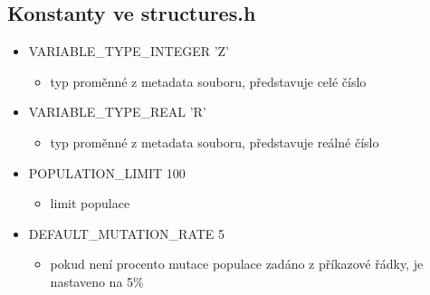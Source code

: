 \documentclass{article}
\begin{document}
\subsection{Konstanty ve structures.h}
\begin{itemize}
\item VARIABLE\_TYPE\_INTEGER 'Z'
\begin{itemize}
\item typ proměnné z metadata souboru, představuje celé číslo
\end{itemize}
\item VARIABLE\_TYPE\_REAL 'R'
\begin{itemize}
\item typ proměnné z metadata souboru, představuje reálné číslo
\end{itemize}
\item POPULATION\_LIMIT 100
\begin{itemize}
\item limit populace
\end{itemize}
\item DEFAULT\_MUTATION\_RATE 5
\begin{itemize}
\item pokud není procento mutace populace zadáno z příkazové řádky, je nastaveno na 5\%
\end{itemize}
\end{itemize}
\end{document}
